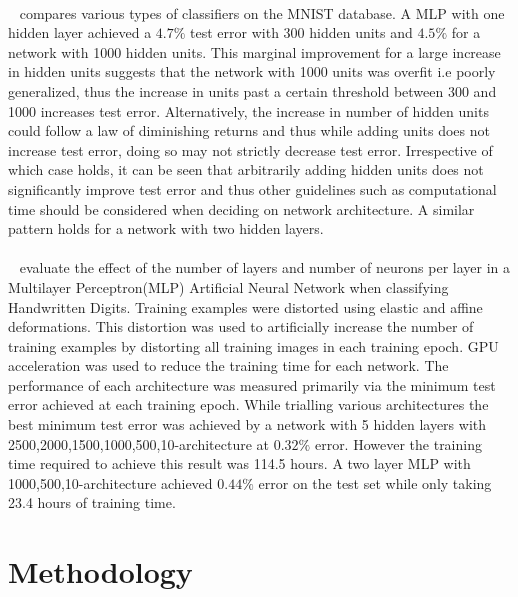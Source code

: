 \documentclass{article}
\begin{document}
 \paragraph{} ~\citet{lecun1998gradient} compares various types of classifiers on the MNIST database. A MLP with one hidden layer achieved a $4.7\%$ test error with 300 hidden units and $4.5\%$ for a network with 1000 hidden units. This marginal improvement for a large increase in hidden units suggests that the network with 1000 units was overfit i.e poorly generalized, thus the increase in units past a certain threshold between 300 and 1000 increases test error. Alternatively, the increase in number of hidden units could follow a law of diminishing returns and thus while adding units does not increase test error, doing so may not strictly decrease test error. Irrespective of which case holds, it can be seen that arbitrarily adding hidden units does not significantly improve test error and thus other guidelines such as computational time should be considered when deciding on network architecture. A similar pattern holds for a network with two hidden layers.
 
 \paragraph{}~\citet{deepsimpleMLP} evaluate the effect of the number of layers and number of neurons per layer in a Multilayer Perceptron(MLP) Artificial Neural Network when classifying Handwritten Digits. Training examples were distorted using elastic and affine deformations. This distortion was used to artificially increase the number of training examples by distorting all training images in each training epoch. GPU acceleration was used to reduce the training time for each network. The performance of each architecture was measured primarily via the minimum test error achieved at each training epoch. While trialling various architectures the best minimum test error was achieved by a network with 5 hidden layers with 2500,2000,1500,1000,500,10-architecture at $0.32\%$ error. However the training time required to achieve this result was 114.5 hours. A two layer MLP with 1000,500,10-architecture achieved $0.44\%$ error on the test set while only taking 23.4 hours of training time. 
 
 

  
\section{Methodology}
\end{document}
